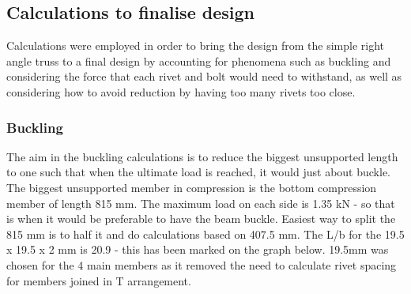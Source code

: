 \documentclass[12pt]{article}
\begin{document}
            \subsection{Calculations to finalise design}
                Calculations were employed in order to bring the design from the simple right angle truss to a final design by accounting for phenomena such as buckling and considering
                the force that each rivet and bolt would need to withstand, as well as considering how to avoid reduction by having too many rivets too close.
                \subsubsection{Buckling}
                    The aim in the buckling calculations is to reduce the biggest unsupported length to one such that when the ultimate load is reached, it would just about buckle.
                    The biggest unsupported member in compression is the bottom compression member of length 815 mm. The maximum load on each side is 1.35 kN - so that is when it would
                    be preferable to have the beam buckle. Easiest way to split the 815 mm is to half it and do calculations based on 407.5 mm. The L/b for the 19.5 x 19.5 x 2 mm
                    is 20.9 - this has been marked on the graph below. 19.5mm was chosen for the 4 main members as it removed the need to calculate rivet spacing for members joined in T arrangement.
\end{document}

